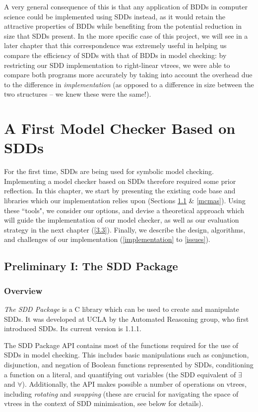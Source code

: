 \documentclass[11pt]{report}
\begin{document}
A very general consequence of this is that any application of BDDs in computer science could be implemented using SDDs instead, as it would retain the attractive properties of BDDs while benefiting from the potential reduction in size that SDDs present. In the more specific case of this project, we will see in a later chapter that this correspondence was extremely useful in helping us compare the efficiency of SDDs with that of BDDs in model checking: by restricting our SDD implementation to right-linear vtrees, we were able to compare both programs more accurately by taking into account the overhead due to the difference in \textit{implementation} (as opposed to a difference in size between the two structures -- we knew these were the same!).

\chapter{A First Model Checker Based on SDDs}

For the first time, SDDs are being used for symbolic model checking. Implementing a model checker based on SDDs therefore required some prior reflection.
In this chapter, we start by presenting the existing code base and libraries which our implementation relies upon (Sections \ref{sdd_package} \& 
\ref{mcmas}). Using these ``tools", we consider our options, and devise a theoretical approach which will guide the implementation of our model checker, as well as our evaluation strategy in the next chapter (\ref{3.3}).
Finally, we describe the design, algorithms, and challenges of our implementation (\ref{implementation} to \ref{issues}).

\section{Preliminary I: The SDD Package}
\label{sdd_package}

\subsection{Overview}

\textit{The SDD Package} \cite{SDD_website} is a C library which can be used to create and manipulate SDDs. It was developed at UCLA by the Automated Reasoning group, who first introduced SDDs. Its current version is 1.1.1.  


The SDD Package API contains most of the functions required for the use of SDDs in model checking. This includes basic manipulations such as conjunction, disjunction, and negation of Boolean functions represented by SDDs, conditioning a function on a literal, and quantifying out variables (the SDD equivalent of $\exists$ and $\forall$). Additionally, the API makes possible a number of operations on vtrees, including \textit{rotating }and \textit{swapping} (these are crucial for navigating the space of vtrees in the context of SDD minimisation, see below for details). 
\end{document}
